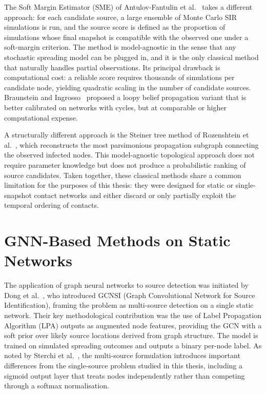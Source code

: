 The Soft Margin Estimator (SME) of Antulov-Fantulin et al.~\cite{AntulovFantulin2015} takes a different approach: for each candidate source, a large ensemble of Monte Carlo SIR simulations is run, and the source score is defined as the proportion of simulations whose final snapshot is compatible with the observed one under a soft-margin criterion. The method is model-agnostic in the sense that any stochastic spreading model can be plugged in, and it is the only classical method that naturally handles partial observations. Its principal drawback is computational cost: a reliable score requires thousands of simulations per candidate node, yielding quadratic scaling in the number of candidate sources. Braunstein and Ingrosso~\cite{Braunstein2016} proposed a loopy belief propagation variant that is better calibrated on networks with cycles, but at comparable or higher computational expense.

A structurally different approach is the Steiner tree method of Rozenshtein et al.~\cite{Rozenshtein2016}, which reconstructs the most parsimonious propagation subgraph connecting the observed infected nodes. This model-agnostic topological approach does not require parameter knowledge but does not produce a probabilistic ranking of source candidates. Taken together, these classical methods share a common limitation for the purposes of this thesis: they were designed for static or single-snapshot contact networks and either discard or only partially exploit the temporal ordering of contacts.

\section{GNN-Based Methods on Static Networks}
\label{sec:rw-gnn-static}

The application of graph neural networks to source detection was initiated by Dong et al.~\cite{Dong2019}, who introduced GCNSI (Graph Convolutional Network for Source Identification), framing the problem as multi-source detection on a single static network. Their key methodological contribution was the use of Label Propagation Algorithm (LPA) outputs as augmented node features, providing the GCN with a soft prior over likely source locations derived from graph structure. The model is trained on simulated spreading outcomes and outputs a binary per-node label. As noted by Sterchi et al.~\cite{Sterchi2025}, the multi-source formulation introduces important differences from the single-source problem studied in this thesis, including a sigmoid output layer that treats nodes independently rather than competing through a softmax normalisation.


